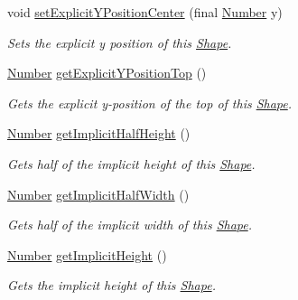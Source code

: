 \begin{DoxyCompactItemize}
void \hyperlink{classcom_1_1aarrelaakso_1_1drawl_1_1_shape_a7d49d69bd74e57c3a3341a025c3cce50}{set\+Explicit\+Y\+Position\+Center} (final \hyperlink{interfacecom_1_1aarrelaakso_1_1drawl_1_1_number}{Number} y)
\begin{DoxyCompactList}\small\item\em Sets the explicit y position of this \hyperlink{classcom_1_1aarrelaakso_1_1drawl_1_1_shape}{Shape}. \end{DoxyCompactList}\item 
\hyperlink{interfacecom_1_1aarrelaakso_1_1drawl_1_1_number}{Number} \hyperlink{classcom_1_1aarrelaakso_1_1drawl_1_1_shape_a8c65dff2026744ae10648de3908165e5}{get\+Explicit\+Y\+Position\+Top} ()
\begin{DoxyCompactList}\small\item\em Gets the explicit y-\/position of the top of this \hyperlink{classcom_1_1aarrelaakso_1_1drawl_1_1_shape}{Shape}. \end{DoxyCompactList}\item 
\hyperlink{interfacecom_1_1aarrelaakso_1_1drawl_1_1_number}{Number} \hyperlink{classcom_1_1aarrelaakso_1_1drawl_1_1_shape_a4af0fd7e309ea01bced73076510ef897}{get\+Implicit\+Half\+Height} ()
\begin{DoxyCompactList}\small\item\em Gets half of the implicit height of this \hyperlink{classcom_1_1aarrelaakso_1_1drawl_1_1_shape}{Shape}. \end{DoxyCompactList}\item 
\hyperlink{interfacecom_1_1aarrelaakso_1_1drawl_1_1_number}{Number} \hyperlink{classcom_1_1aarrelaakso_1_1drawl_1_1_shape_a02d73887a309bcd1178b142ad0c7edd9}{get\+Implicit\+Half\+Width} ()
\begin{DoxyCompactList}\small\item\em Gets half of the implicit width of this \hyperlink{classcom_1_1aarrelaakso_1_1drawl_1_1_shape}{Shape}. \end{DoxyCompactList}\item 
\hyperlink{interfacecom_1_1aarrelaakso_1_1drawl_1_1_number}{Number} \hyperlink{classcom_1_1aarrelaakso_1_1drawl_1_1_shape_a3b0ad73b41fe8c9ae66d20f7fc1de7c9}{get\+Implicit\+Height} ()
\begin{DoxyCompactList}\small\item\em Gets the implicit height of this \hyperlink{classcom_1_1aarrelaakso_1_1drawl_1_1_shape}{Shape}. \end{DoxyCompactList}\item 

\end{DoxyCompactItemize}

